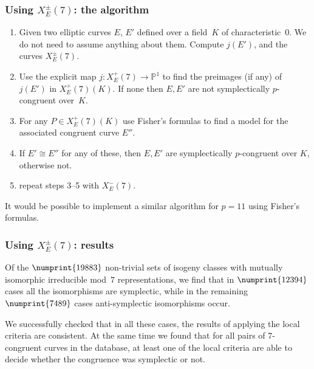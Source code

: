 \documentclass[handout]{beamer}
\newcommand{\PP}{\mathbb P}
\begin{document}
\begin{frame}\frametitle{Using $X_E^{\pm}(7)$: the algorithm}
\begin{enumerate}
\item Given two elliptic curves $E$, $E'$ defined over a field~$K$ of
  characteristic~$0$. We do not need to assume anything about them.
  Compute $j(E')$, and the curves $X_E^{\pm}(7)$.
\item Use the explicit map $j:X_E^+(7)\to\PP^1$ to find the preimages
  (if any) of $j(E')$ in $X_E^+(7)(K)$.  If none then $E,E'$ are not
  symplectically $p$-congruent over~$K$.
\item For any $P\in X_E^+(7)(K)$ use Fisher's formulas to find a model
  for the associated congruent curve $E''$.
\item If $E'\cong E''$ for any of these, then $E,E'$ are
  symplectically $p$-congruent
  over $K$, otherwise not.
\item repeat steps 3--5 with $X_E^-(7)$.
\end{enumerate}
\pause
It would be possible to implement a similar algorithm for $p=11$ using
Fisher's formulas.
\end{frame}

\begin{frame}\frametitle{Using $X_E^{\pm}(7)$: results}
Of the $\numprint{19883}$ non-trivial sets of isogeny classes with mutually
isomorphic irreducible mod~$7$ representations, we find that in
$\numprint{12394}$ cases all the isomorphisms are symplectic, while in the
remaining $\numprint{7489}$ cases anti-symplectic isomorphisms occur.
\medskip
\pause

We successfully checked that in all these cases, the results of
applying the local criteria are consistent.  At the same time we found
that for all pairs of $7$-congruent curves in the database, at least
one of the local criteria are able to decide whether the congruence
was symplectic or not.


\end{frame}
\end{document}
